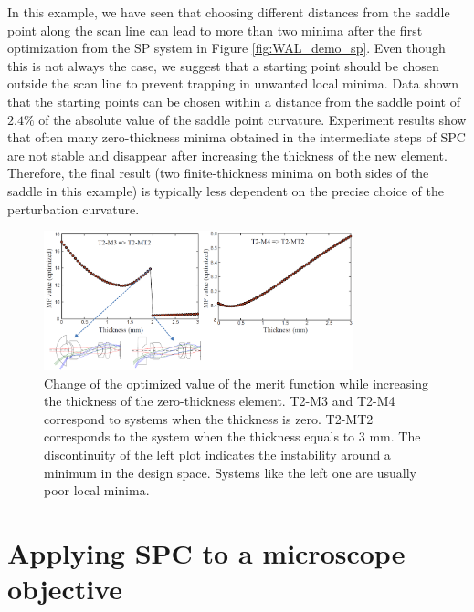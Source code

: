  In this example,  we have seen that choosing different distances from the saddle point along the scan line can lead to more than two minima after the first optimization from the SP system in Figure \ref{fig:WAL_demo_sp}. Even though this is not always the case, we suggest that a starting point should be chosen outside the scan line to prevent trapping in unwanted local minima. Data shown that the starting points can be chosen within a distance from the saddle point of $2.4\%$ of the absolute value of the saddle point curvature. Experiment results show that often many zero-thickness minima obtained in the intermediate steps of SPC are not stable and disappear after increasing the thickness of the new element. Therefore, the final result (two finite-thickness minima on both sides of the saddle in this example) is typically less dependent on the precise choice of the perturbation curvature.  
\begin{figure}[h!]
    \centering
    \includegraphics[width=0.8\textwidth]{chapter-4/figures/thickness_increase.png}
    \caption{Change of the optimized value of the merit function while increasing the thickness of the zero-thickness element. T2-M3 and T2-M4 correspond to systems when the thickness is zero. T2-MT2 corresponds to the system when the thickness equals to 3 mm. The discontinuity of the left plot indicates the instability around a minimum in the design space. Systems like the left one are usually poor local minima.}
    \label{fig:thickness_increase}
\end{figure}

\section{Applying SPC to a microscope objective}
